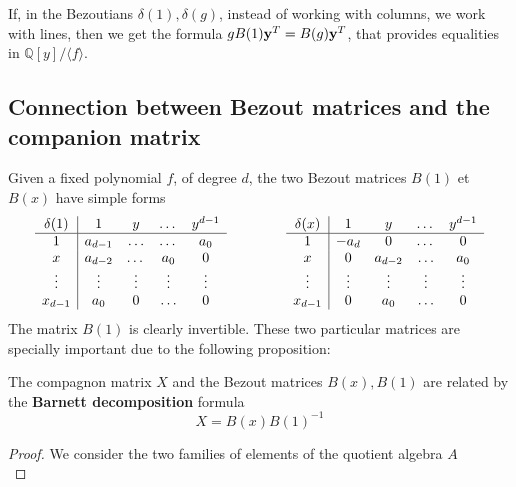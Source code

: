 \documentclass{standalone}
\begin{document}
\begin{rem}
\begin{rem}
If, in the Bezoutians $\delta(1), \delta(g)$, instead of working with columns, we work with lines, then we get the formula 
$gB(1)\bold{y}^T = B(g)\bold{y}^T$, that provides equalities in $\mathbb{Q}[y]/\langle f \rangle$.
\end{rem}


\subsection{Connection between Bezout matrices and the companion matrix}
\label{Bar}
Given a fixed polynomial $f$, of degree $d$, the two Bezout matrices $B(1)$ et $B(x)$ have simple forms
\begin{equation}
	\begin{array}{c|cccc}
		\delta(1) & 1 & y & \dots & y^{d-1} \\
		\hline
		1 & a_{d-1} & \ldots & \dots & a_0 \\
		x & a_{d-2} & \dots & a_0 & 0 \\
		\vdots & \vdots & \vdots & \vdots & \vdots \\
		x_{d-1} & a_0 & 0 & \ldots & 0 \\
	\end{array}
	\hspace{1.5cm}
	\begin{array}{c|cccc}
		\delta(x) & 1 & y & \dots & y^{d-1} \\
		\hline
		1 & -a_{d} & 0 & \dots & 0 \\
		x & 0 & a_{d-2} & \ldots & a_0 \\
		\vdots & \vdots & \vdots & \vdots & \vdots \\
		x_{d-1} & 0 & a_0 & \ldots & 0 \\
	\end{array}
\end{equation}
The matrix $B(1)$ is clearly invertible. These two particular matrices are specially important due to the following proposition:
\begin{prop}
\label{Barnett}
The compagnon matrix $X$ and the Bezout matrices $B(x), B(1)$ are related by the {\bf Barnett decomposition} formula
\cite{Barnett}
\begin{equation}
	X = B(x)B(1)^{-1}
\end{equation}
\end{prop}
\begin{proof}
We consider the two families of elements of the quotient algebra $A$
\begin{equation}

\end{equation}
\end{proof}
\end{rem}
\end{document}
